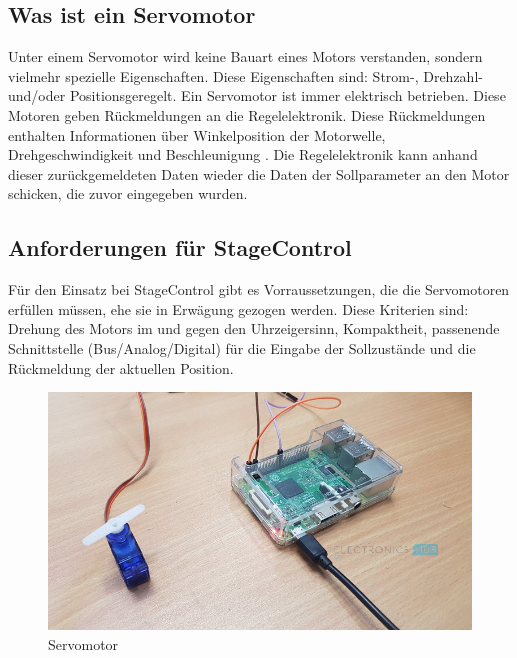 \subsection{Was ist ein Servomotor}
Unter einem Servomotor wird keine Bauart eines Motors verstanden, sondern vielmehr spezielle Eigenschaften. Diese Eigenschaften sind: Strom-, Drehzahl- und/oder Positionsgeregelt. Ein Servomotor ist immer elektrisch betrieben. Diese Motoren geben Rückmeldungen an die Regelelektronik. Diese Rückmeldungen enthalten Informationen über Winkelposition der Motorwelle, Drehgeschwindigkeit und Beschleunigung \parencite{ServomotorInfo}. Die Regelelektronik kann anhand dieser zurückgemeldeten Daten wieder die Daten der Sollparameter an den Motor schicken, die zuvor eingegeben wurden. \\


\subsection{Anforderungen für StageControl}
Für den Einsatz bei StageControl gibt es Vorraussetzungen, die die Servomotoren erfüllen müssen, ehe sie in Erwägung gezogen werden. Diese Kriterien sind: Drehung des Motors im und gegen den Uhrzeigersinn, Kompaktheit, passenende Schnittstelle (Bus/Analog/Digital) für die Eingabe der Sollzustände und die Rückmeldung der aktuellen Position.

\begin{figure}[H]
	\centering
	\includegraphics[width=0.7\linewidth]{images/servo.jpg}
	\caption[Servomotor]{Servomotor}
	\label{fig:Servo}
\end{figure}

\newpage
